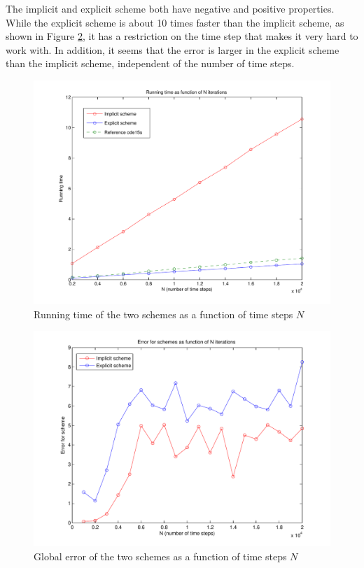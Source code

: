 The implicit and explicit scheme both have negative and positive properties. While the explicit scheme is about 10 times faster than the implicit scheme, as shown in Figure \ref{fig:runTime}, it has a restriction on the time step that makes it very hard to work with. In addition, it seems that the error is larger in the explicit scheme than the implicit scheme, independent of the number of time steps.

\begin{figure}[H]
\centering
\includegraphics[scale=0.4]
{../PDFs/Comparisons/running_time3.pdf}
\caption{Running time of the two schemes as a function of time steps $N$}
\label{fig:runTime}
\end{figure}

\begin{figure}[H]
\centering
\includegraphics[scale=0.4]
{../PDFs/Comparisons/error_compare.pdf}
\caption{Global error of the two schemes as a function of time steps $N$}
\label{fig:runTime}
\end{figure}